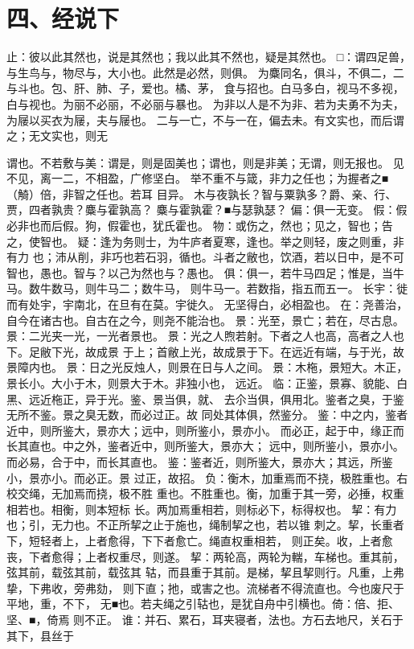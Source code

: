 \documentclass[12pt,UTF8]{ctexbook}
\begin{document}
\chapter{四、经说下}

止：彼以此其然也，说是其然也；我以此其不然也，疑是其然也。 
□：谓四足兽，与生鸟与，物尽与，大小也。此然是必然，则俱。 
为麋同名，俱斗，不俱二，二与斗也。包、肝、肺、子，爱也。橘、茅， 
食与招也。白马多白，视马不多视，白与视也。为丽不必丽，不必丽与暴也。 
为非以人是不为非、若为夫勇不为夫，为屦以买衣为屦，夫与屦也。 
二与一亡，不与一在，偏去未。有文实也，而后谓之；无文实也，则无 

谓也。不若敷与美：谓是，则是固美也；谓也，则是非美；无谓，则无报也。 
见不见，离一二，不相盈，广修坚白。 
举不重不与箴，非力之任也；为握者之■（觭）倍，非智之任也。若耳 
目异。 
木与夜孰长？智与粟孰多？爵、亲、行、贾，四者孰贵？麋与霍孰高？ 
麋与霍孰霍？■与瑟孰瑟？ 
偏：俱一无变。 
假：假必非也而后假。狗，假霍也，犹氏霍也。 
物：或伤之，然也；见之，智也；告之，使智也。 
疑：逢为务则士，为牛庐者夏寒，逢也。举之则轻，废之则重，非有力 
也；沛从削，非巧也若石羽，循也。斗者之敝也，饮酒，若以日中，是不可 
智也，愚也。智与？以己为然也与？愚也。 
俱：俱一，若牛马四足；惟是，当牛马。数牛数马，则牛马二；数牛马， 
则牛马一。若数指，指五而五一。 
长宇：徙而有处宇，宇南北，在旦有在莫。宇徙久。 
无坚得白，必相盈也。 
在：尧善治，自今在诸古也。自古在之今，则尧不能治也。 
景：光至，景亡；若在，尽古息。 
景：二光夹一光，一光者景也。 
景：光之人煦若射。下者之人也高，高者之人也下。足敝下光，故成景 
于上；首敝上光，故成景于下。在远近有端，与于光，故景障内也。 
景：日之光反烛人，则景在日与人之间。 
景：木柂，景短大。木正，景长小。大小于木，则景大于木。非独小也， 
远近。 
临：正鉴，景寡、貌能、白黑、远近柂正，异于光。鉴、景当俱，就、 
去尒当俱，俱用北。鉴者之臭，于鉴无所不鉴。景之臭无数，而必过正。故 
同处其体俱，然鉴分。 
鉴：中之内，鉴者近中，则所鉴大，景亦大；远中，则所鉴小，景亦小。 
而必正，起于中，缘正而长其直也。中之外，鉴者近中，则所鉴大，景亦大； 
远中，则所鉴小，景亦小。而必易，合于中，而长其直也。 
鉴：鉴者近，则所鉴大，景亦大；其远，所鉴小，景亦小。而必正。景 
过正，故招。 
负：衡木，加重焉而不挠，极胜重也。右校交绳，无加焉而挠，极不胜 
重也。不胜重也。衡，加重于其一旁，必捶，权重相若也。相衡，则本短标 
长。两加焉重相若，则标必下，标得权也。 
挈：有力也；引，无力也。不正所挈之止于施也，绳制挈之也，若以锥 
刺之。挈，长重者下，短轻者上，上者愈得，下下者愈亡。绳直权重相若， 
则正矣。收，上者愈丧，下者愈得；上者权重尽，则遂。 
挈：两轮高，两轮为輲，车梯也。重其前，弦其前，载弦其前，载弦其 
轱，而县重于其前。是梯，挈且挈则行。凡重，上弗挚，下弗收，旁弗劾， 
则下直；扡，或害之也。流梯者不得流直也。今也废尺于平地，重，不下， 
无■也。若夫绳之引轱也，是犹自舟中引横也。倚：倍、拒、坚、■，倚焉 
则不正。 
谁：并石、累石，耳夹寝者，法也。方石去地尺，关石于其下，县丝于 
\end{document}
